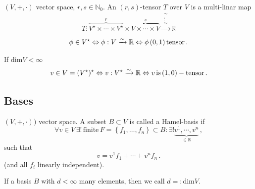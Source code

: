 \documentclass[11pt, a4paper, twocolumn]{article} %
\begin{document}
\begin{defn}[$(r, s)$ - Tensors]
    $(V, +, \cdot)$ vector space, $r, s\in \mathbb{N}_0$.
    An $(r, s)$-tensor $T$ over $V$ is a multi-linar map
    \begin{equation}
        T: \overbrace{V^\star \times \cdots \times V^\star}^r \times
        \overbrace{V \times \cdots \times V}^s \xrightarrow{\begin{smallmatrix} \sim\\ \vdots \\ \sim \end{smallmatrix}} \mathbb{R}
    \end{equation}
\end{defn}
\begin{theorem}
    \begin{equation}
        \phi\in V^\star \Leftrightarrow \phi: V\xrightarrow[]{\sim} \mathbb{R} \Leftrightarrow \phi\,(0,1)\,\text{tensor}\,.
    \end{equation}
\end{theorem}
\begin{theorem}
    If $\text{dim}V < \infty$
    \begin{equation}
        v \in V = (V^\star)^\star \Leftrightarrow 
        v: V^\star \xrightarrow[]{\sim} \mathbb{R} \Leftrightarrow
        v\,\text{is}\, (1,0)-\text{tensor}\,.
    \end{equation}
\end{theorem}

\subsection{Bases}
\begin{defn}
    $(V, +, \cdot))$ vector space. A subset $B \subset V$ is called a Hamel-basis if
    \begin{equation}
        \forall v\in V\, \exists!\,\text{finite}\,F=\left\{ f_1,\ldots,f_n \right\}\subset B: \exists! \underbrace{v^1, \cdots, v^n}_{\in \mathbb{R}}\,,
    \end{equation}
    such that
    \begin{equation}
        v = v^1 f_1 + \cdots + v^n f_n\,.
    \end{equation}
    (and all $f_i$ linearly independent).
\end{defn}
\begin{defn}
    If a basis $B$ with $d<\infty$ many elements, then we call $d =: \text{dim}V$.
\end{defn}
\end{document}
